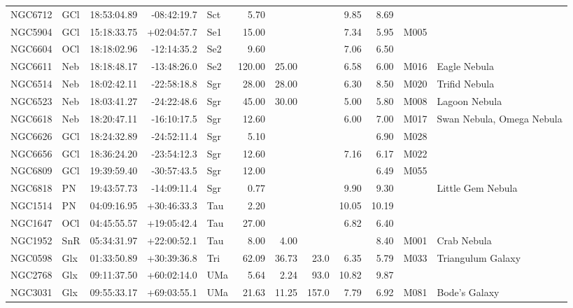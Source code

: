 \documentclass[11pt]{article}
\begin{document}
\begin{longtable}{llrrlrrrrrrl}
  NGC6712 & GCl     & 18:53:04.89 & -08:42:19.7 & Sct & 5.70   &        &       & 9.85  & 8.69   &      & \\
  NGC5904 & GCl     & 15:18:33.75 & +02:04:57.7 & Se1 & 15.00  &        &       & 7.34  & 5.95   & M005 & \\
  NGC6604 & OCl     & 18:18:02.96 & -12:14:35.2 & Se2 & 9.60   &        &       & 7.06  & 6.50   &      & \\
  NGC6611 & Neb     & 18:18:48.17 & -13:48:26.0 & Se2 & 120.00 & 25.00  &       & 6.58  & 6.00   & M016 & Eagle Nebula \\
  NGC6514 & Neb     & 18:02:42.11 & -22:58:18.8 & Sgr & 28.00  & 28.00  &       & 6.30  & 8.50   & M020 & Trifid Nebula \\
  NGC6523 & Neb     & 18:03:41.27 & -24:22:48.6 & Sgr & 45.00  & 30.00  &       & 5.00  & 5.80   & M008 & Lagoon Nebula \\
  NGC6618 & Neb     & 18:20:47.11 & -16:10:17.5 & Sgr & 12.60  &        &       & 6.00  & 7.00   & M017 & Swan Nebula, Omega Nebula \\
  NGC6626 & GCl     & 18:24:32.89 & -24:52:11.4 & Sgr & 5.10   &        &       &       & 6.90   & M028 & \\
  NGC6656 & GCl     & 18:36:24.20 & -23:54:12.3 & Sgr & 12.60  &        &       & 7.16  & 6.17   & M022 & \\
  NGC6809 & GCl     & 19:39:59.40 & -30:57:43.5 & Sgr & 12.00  &        &       &       & 6.49   & M055 & \\
  NGC6818 & PN      & 19:43:57.73 & -14:09:11.4 & Sgr & 0.77   &        &       & 9.90  & 9.30   &      & Little Gem Nebula \\
  NGC1514 & PN      & 04:09:16.95 & +30:46:33.3 & Tau & 2.20   &        &       & 10.05 & 10.19  &      & \\
  NGC1647 & OCl     & 04:45:55.57 & +19:05:42.4 & Tau & 27.00  &        &       & 6.82  & 6.40   &      & \\
  NGC1952 & SnR     & 05:34:31.97 & +22:00:52.1 & Tau & 8.00   & 4.00   &       &       & 8.40   & M001 & Crab Nebula \\
  NGC0598 & Glx     & 01:33:50.89 & +30:39:36.8 & Tri & 62.09  & 36.73  & 23.0  & 6.35  & 5.79   & M033 & Triangulum Galaxy \\
  NGC2768 & Glx     & 09:11:37.50 & +60:02:14.0 & UMa & 5.64   & 2.24   & 93.0  & 10.82 & 9.87   &      & \\
  NGC3031 & Glx     & 09:55:33.17 & +69:03:55.1 & UMa & 21.63  & 11.25  & 157.0 & 7.79  & 6.92   & M081 & Bode's Galaxy \\

\end{longtable}
\end{document}
